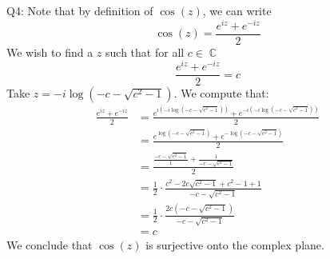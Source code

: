 \documentclass[letterpaper]{article}
\DeclareMathOperator{\C}{\mathbb{C}}
\begin{document}
\noindent
Q4: Note that by definition of $\cos(z)$, we can write $$\cos(z) = \frac{e^{iz} + e^{-iz}}{2}$$ We wish to find a $z$ such that for all $c\in \C$ $$\frac{e^{iz} + e^{-iz}}{2}=c$$
Take $z = -i \log(-c - \sqrt{c^2-1})$. We compute that:
\begin{align*}
    \frac{e^{iz} + e^{-iz}}{2} & = \frac{e^{i (-i \log(-c - \sqrt{c^2-1}))} + e^{-i(-i \log(-c - \sqrt{c^2-1}))}}{2}
    \\ & = \frac{e^{\log(-c - \sqrt{c^2-1})} + e^{-\log(-c - \sqrt{c^2-1})}}{2}
    \\ & = \frac{\frac{-c - \sqrt{c^2-1}}{1} + \frac{1}{-c - \sqrt{c^2-1}}}{2}
    \\ & =  \frac{1}{2}\cdot \frac{c^2 -2c\sqrt{c^2-1} + c^2-1+1}{-c - \sqrt{c^2-1}}
    \\ & = \frac{1}{2} \cdot \frac{2c(-c - \sqrt{c^2-1})}{-c-\sqrt{c^2-1}}
    \\ & = c
\end{align*}
We conclude that $\cos(z)$ is surjective onto the complex plane. 
\end{document}
